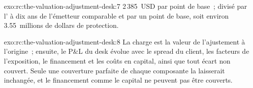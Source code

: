 \begin{solution}{exo:rc:the-valuation-adjustment-desk:7}
2\,385~USD par point de base~; divisé par l' à dix ans de l'émetteur comparable et par un point de base,
soit environ 3.55~millions de dollars de protection.
\end{solution}

\begin{solution}{exo:rc:the-valuation-adjustment-desk:8}
La charge est la valeur de l'ajustement à l'origine~; ensuite, le P\&L du desk évolue avec le
spread du client, les facteurs de l'exposition, le financement et les coûts en capital, ainsi que tout écart non couvert. Seule une
couverture parfaite de chaque composante la laisserait inchangée, et le financement comme le capital ne peuvent pas être couverts.
\end{solution}

